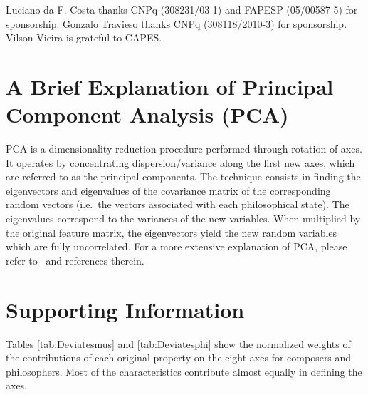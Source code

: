 \documentclass[
 aip,
 jmp,
 amsmath,amssymb,
 reprint,
]{revtex4-1}
\begin{document}
\begin{acknowledgments}
Luciano da F. Costa thanks CNPq (308231/03-1) and FAPESP (05/00587-5)
for sponsorship. Gonzalo Travieso thanks CNPq (308118/2010-3) for
sponsorship. Vilson Vieira is grateful to CAPES.
\end{acknowledgments}

\appendix

\section{A Brief Explanation of Principal Component Analysis (PCA)}

PCA is a dimensionality reduction procedure performed through rotation
of axes.  It operates by concentrating dispersion/variance along the
first new axes, which are referred to as the principal components. The
technique consists in finding the eigenvectors and eigenvalues of the
covariance matrix of the corresponding random vectors (i.e.\ the
vectors associated with each philosophical state). The eigenvalues
correspond to the variances of the new variables.  When multiplied by
the original feature matrix, the eigenvectors yield the new random
variables which are fully uncorrelated. For a more extensive
explanation of PCA, please refer to~\cite{Costa} and references
therein.

\section{Supporting Information}

Tables \ref{tab:Deviatesmus} and \ref{tab:Deviatesphi} show the
normalized weights of the contributions of each original property on
the eight axes for composers and philosophers. Most of the
characteristics contribute almost equally in defining the axes.
\end{document}
